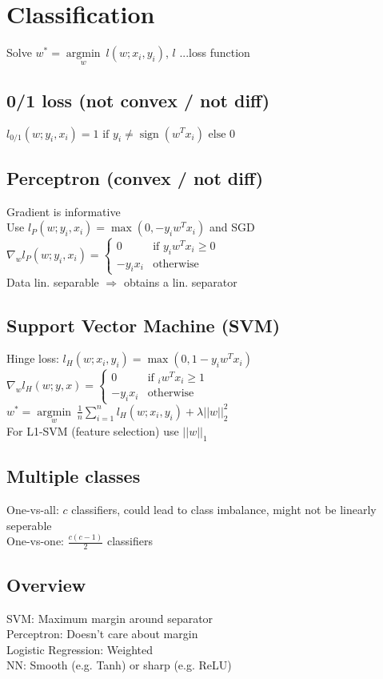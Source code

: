 \section*{Classification}

Solve $w^* = \underset{w}{\operatorname{argmin}} ~ l(w;x_i,y_i)$, $l$ ...loss function

\subsection*{0/1 loss (not convex / not diff)}
$l_{0/1} (w;y_i,x_i) = 1 \text{ if } y_i \neq \operatorname{sign}(w^Tx_i) \text{ else } 0$

\subsection*{Perceptron (convex / not diff)}
Gradient is informative\\
Use $l_P (w;y_i,x_i) = \operatorname{max}(0, -y_i w^T x_i)$ and SGD\\
$\nabla_w l_P(w;y_i,x_i) = 
\begin{cases}
    0 &\text{if } y_i w^T x_i \geq 0\\
    -y_i x_i &\text{otherwise}
\end{cases}$ \\
Data lin. separable $\Rightarrow$ obtains a lin. separator

\subsection*{Support Vector Machine (SVM)}
Hinge loss: $l_H(w;x_i,y_i) = \operatorname{max}(0,1-y_i w^T x_i)$ \\
$\nabla_w l_H(w;y,x) = 
\begin{cases}
    0 &\text{if } _i w^T x_i \geq 1\\
    -y_i x_i &\text{otherwise}
\end{cases}$\\
$w^* = \underset{w}{\operatorname{argmin}} ~ \frac{1}{n} \sum_{i=1}^n l_H(w;x_i,y_i) + \lambda||w||_2^2$\\ For L1-SVM (feature selection) use $||w||_1$ 

\subsection*{Multiple classes}
One-vs-all: $c$ classifiers, could lead to class imbalance, might not be linearly seperable\\
One-vs-one: $\frac{c(c-1)}{2}$ classifiers

\subsection*{Overview}
SVM: Maximum margin around separator\\
Perceptron: Doesn't care about margin\\
Logistic Regression: Weighted\\
NN: Smooth (e.g. Tanh) or sharp (e.g. ReLU)